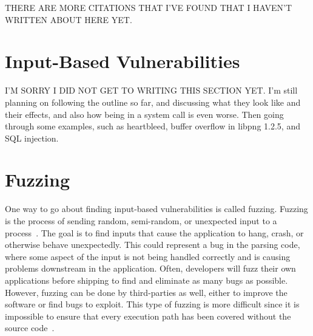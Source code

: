 THERE ARE MORE CITATIONS THAT I'VE FOUND THAT I HAVEN'T WRITTEN ABOUT HERE YET.

\section{Input-Based Vulnerabilities}
\label{sec:inputBasedVulnerabilities}
I'M SORRY I DID NOT GET TO WRITING THIS SECTION YET.  I'm still planning on following the outline so far, and discussing what they look like and their effects, and also how being in a system call is even worse.  Then going through some examples, such as heartbleed, buffer overflow in libpng 1.2.5, and SQL injection.

\section{Fuzzing}
\label{sec:fuzzing}
One way to go about finding input-based vulnerabilities is called fuzzing.  Fuzzing is the process of sending random, semi-random, or unexpected input to a process~\cite[21--22]{fuzzing}.  The goal is to find inputs that cause the application to hang, crash, or otherwise behave unexpectedly.  This could represent a bug in the parsing code, where some aspect of the input is not being handled correctly and is causing problems downstream in the application.  Often, developers will fuzz their own applications before shipping to find and eliminate as many bugs as possible.  However, fuzzing can be done by third-parties as well, either to improve the software or find bugs to exploit.  This type of fuzzing is more difficult since it is impossible to ensure that every execution path has been covered without the source code~\cite{godefroid2012sage}.
